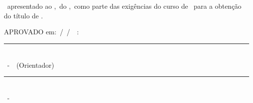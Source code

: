 
%    


\begin{folhadeaprovacao}

\begin{center}
    \large { \imprimirautor}  \\
		\vspace{3cm} 
		\large {\textbf{\MakeTextUppercase{\imprimirtitulo}}~\MakeTextLowercase{\imprimirsubtitulo}}
    \end{center}
    \vspace{2cm}
    \begin{flushright} 
    \parbox{0.6\linewidth}{			\imprimirtipotrabalho~apresentado ao \imprimirinstituto,~do \imprimirinstituicao,~como parte das exigências do curso de \imprimircurso~para a obtenção do título de \imprimirgrau. \\
		}
   \end{flushright} 
   \vfill
 
   \begin{center}
   \large{
   APROVADO em:~\imprimirdia /\ \imprimirmes/\ \imprimirano~:
    \vspace{2cm}
    \vfill
          \rule{15cm}{.1pt} \\
      {\imprimirorientador}~-~{\imprimirttorientador}~(Orientador) 
      \vfill
			 \vfill
      \rule{15cm}{.1pt} \\
      {\imprimirexaminadorum}~-~{\imprimirttexaminadorum} %
        \vfill
        \ifdefvoid{\imprimirexaminadordois}{}{
        \rule{15cm}{.1pt} \\
        \imprimirexaminadordois~-~\imprimirttexaminadordois %
        }
				\vfill
        \ifdefvoid{\imprimirexaminadortres}{}{
        \rule{15cm}{.1pt} \\
        \imprimirexaminadortres~-~\imprimirttexaminadortres %
        }
				\vfill
        \ifdefvoid{\imprimirexaminadorquatro}{}{
        \rule{15cm}{.1pt} \\
        \imprimirexaminadorquatro~-~\imprimirttexaminadorquatro %
        }
   
}
\end{center}
\end{folhadeaprovacao}
